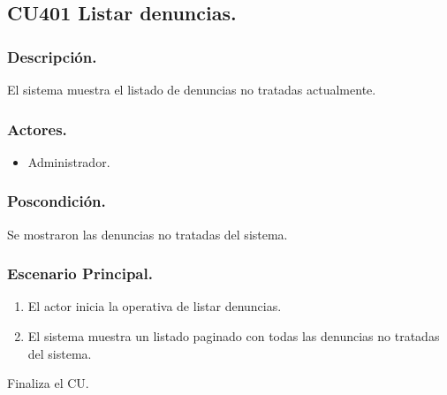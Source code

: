 \subsection{CU401 Listar denuncias.}
\subsubsection{Descripci\'{o}n.}
El sistema muestra el listado de denuncias no tratadas actualmente.
\subsubsection{Actores.}
\begin{itemize}
\item Administrador.
\end{itemize}
\subsubsection{Poscondici\'{o}n.}
Se mostraron las denuncias no tratadas del sistema.
\subsubsection{Escenario Principal.}
\begin{enumerate}
\item El actor inicia la operativa de listar denuncias.
\item El sistema muestra un listado paginado con todas las denuncias no tratadas del sistema.
\end{enumerate}
Finaliza el CU.
